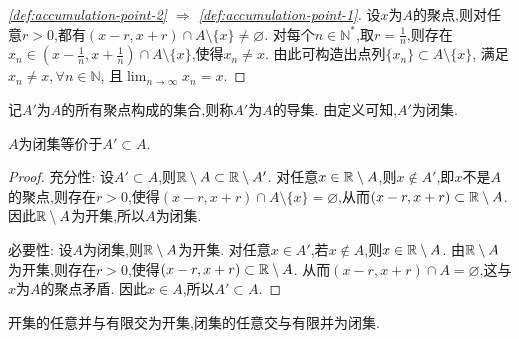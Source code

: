 \begin{proof}
     [\autoref{def:accumulation-point-2} $\Rightarrow$ \autoref{def:accumulation-point-1}]

    设$x$为$A$的聚点,则对任意$r > 0$,都有$(x-r,x+r) \cap A \setminus \{x\} \neq \varnothing$. 对每个$n \in \mathbb{N}^*$,取$r = \frac{1}{n}$,则存在$x_n \in (x-\frac{1}{n},x+\frac{1}{n}) \cap A \setminus \{x\}$,使得$x_n \neq x$. 由此可构造出点列$\{ x_n \} \subset A \setminus \{x\}$, 满足$x_n \neq x, \forall n \in \mathbb{N}$, 且$\lim_{n \to \infty} x_n = x$.
\end{proof}

记$A'$为$A$的所有聚点构成的集合,则称$A'$为$A$的导集. 由定义可知,$A'$为闭集.

\begin{proposition}
    $A$为闭集等价于$A' \subset A$.
\end{proposition}

\begin{proof}
    充分性: 设$A' \subset A$,则$\mathbb{R} \setminus A \subset \mathbb{R} \setminus A'$. 对任意$x \in \mathbb{R} \setminus A$,则$x \notin A'$,即$x$不是$A$的聚点,则存在$r > 0$,使得$(x-r,x+r) \cap A \setminus \{x\} = \varnothing$,从而$(x-r,x+r) \subset \mathbb{R} \setminus A$. 因此$\mathbb{R} \setminus A$为开集,所以$A$为闭集.

    必要性: 设$A$为闭集,则$\mathbb{R} \setminus A$为开集. 对任意$x \in A'$,若$x \notin A$,则$x \in \mathbb{R} \setminus A$. 由$\mathbb{R} \setminus A$为开集,则存在$r > 0$,使得$(x-r,x+r) \subset \mathbb{R} \setminus A$. 从而$(x-r,x+r) \cap A = \varnothing$,这与$x$为$A$的聚点矛盾. 因此$x \in A$,所以$A' \subset A$.
\end{proof}


\begin{proposition}
    开集的任意并与有限交为开集,闭集的任意交与有限并为闭集.
\end{proposition}

